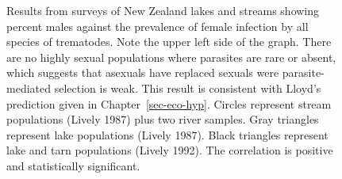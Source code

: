 \documentclass[
  letterpaper,
]{book}
\begin{document}
\begin{figure}


\caption[Results from surveys of New Zealand lakes and streams showing
percent males against the prevalence of female infection by all species
of trematodes]{\label{fig-3-5}Results from surveys of New Zealand lakes
and streams showing percent males against the prevalence of female
infection by all species of trematodes. Note the upper left side of the
graph. There are no highly sexual populations where parasites are rare
or absent, which suggests that asexuals have replaced sexuals were
parasite-mediated selection is weak. This result is consistent with
Lloyd's prediction given in Chapter~\ref{sec-eco-hyp}. Circles represent
stream populations (Lively 1987) plus two river samples. Gray triangles
represent lake populations (Lively 1987). Black triangles represent lake
and tarn populations (Lively 1992). The correlation is positive and
statistically significant.}

\end{figure}%
\end{document}
